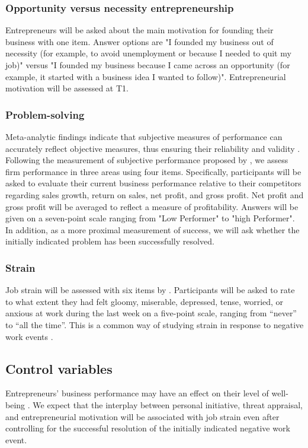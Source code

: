 \documentclass[man, 12pt, a4paper, noextraspace]{apa6}
\begin{document}
\subsubsection{Opportunity versus necessity entrepreneurship}
Entrepreneurs will be asked about the main motivation for founding their business with one item.
Answer options are "I founded my business out of necessity (for example, to avoid unemployment or because I needed to quit my job)" versus "I founded my business because I came across an opportunity (for example, it started with a business idea I wanted to follow)". 
Entrepreneurial motivation will be assessed at T1. 

\subsubsection{Problem-solving}
Meta-analytic findings indicate that subjective measures of performance can accurately reflect objective measures, thus ensuring their reliability and validity \parencite{Rauch2009}.
Following the measurement of subjective performance proposed by \textcite{Lumpkin2001}, we assess firm performance in three areas using four items. 
Specifically, participants will be asked to evaluate their current business performance relative to their competitors regarding sales growth, return on sales, net profit, and gross profit. 
Net profit and gross profit will be averaged to reflect a measure of profitability. 
Answers will be given on a seven-point scale ranging from "Low Performer" to "high Performer".
In addition, as a more proximal measurement of success, we will ask whether the initially indicated problem has been successfully resolved. 

\subsubsection{Strain}
Job strain will be assessed with six items by \textcite{Warr1990}. 
Participants will be asked to rate to what extent they had felt gloomy, miserable, depressed, tense, worried, or anxious at work during the last week on a five-point scale, ranging from “never” to “all the time”. 
This is a common way of studying strain in response to negative work events \parencite[e.g.,][]{Jackson1985}. 

\subsection{Control variables}
Entrepreneurs' business performance may have an effect on their level of well-being \parencite[e.g.,][]{Dijkhuizen2018}. 
We expect that the interplay between personal initiative, threat appraisal, and entrepreneurial motivation will be associated with job strain even after controlling for the successful resolution of the initially indicated negative work event. \par 
\end{document}

